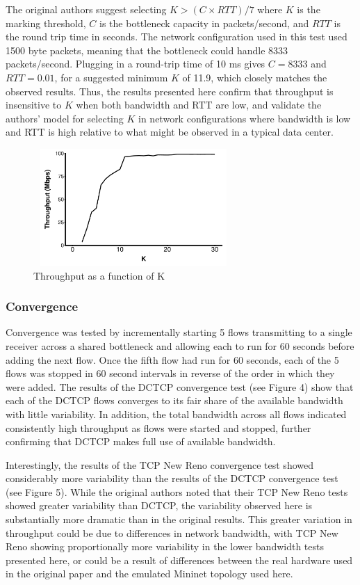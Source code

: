 The original authors suggest selecting $K > (C \times RTT) / 7$ where $K$ is the marking threshold, $C$ is the bottleneck capacity in packets/second, and $RTT$ is the round trip time in seconds. The network configuration used in this test used 1500 byte packets, meaning that the bottleneck could handle 8333 packets/second. Plugging in a round-trip time of 10 ms gives $C = 8333$ and $RTT = 0.01$, for a suggested minimum $K$ of 11.9, which closely matches the observed results. Thus, the results presented here confirm that throughput is insensitive to $K$ when both bandwidth and RTT are low, and validate the authors' model for selecting $K$ in network configurations where bandwidth is low and RTT is high relative to what might be observed in a typical data center.

\begin{figure}
\includegraphics[height=1.75in,width=3in]{k_throughput_delay}
\caption{Throughput as a function of K}
\end{figure}

\subsubsection{Convergence}

Convergence was tested by incrementally starting 5 flows transmitting to a single receiver across a shared bottleneck and allowing each to run for 60 seconds before adding the next flow. Once the fifth flow had run for 60 seconds, each of the 5 flows was stopped in 60 second intervals in reverse of the order in which they were added. The results of the DCTCP convergence test (see Figure 4) show that each of the DCTCP flows converges to its fair share of the available bandwidth with little variability. In addition, the total bandwidth across all flows indicated consistently high throughput as flows were started and stopped, further confirming that DCTCP makes full use of available bandwidth.

Interestingly, the results of the TCP New Reno convergence test showed considerably more variability than the results of the DCTCP convergence test (see Figure 5). While the original authors noted that their TCP New Reno tests showed greater variability than DCTCP, the variability observed here is substantially more dramatic than in the original results. This greater variation in throughput could be due to differences in network bandwidth, with TCP New Reno showing proportionally more variability in the lower bandwidth tests presented here, or could be a result of differences between the real hardware used in the original paper and the emulated Mininet topology used here.

